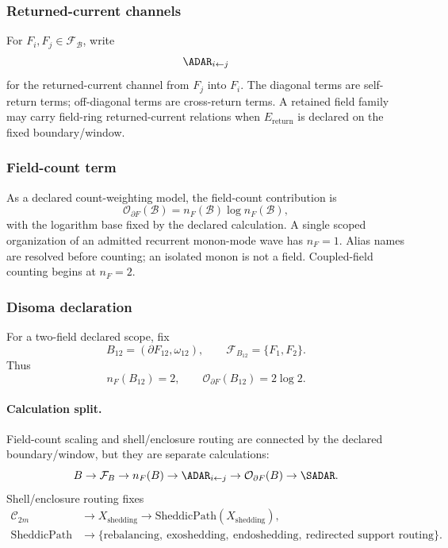 \subsubsection{Returned-current channels}
\label{subsec:returned-current-channels}
For \(F_i,F_j\in\mathcal F_{\mathcal B}\), write
\[
\ADAR_{i\leftarrow j}
\]
for the returned-current channel from \(F_j\) into \(F_i\). The diagonal terms are self-return terms; off-diagonal terms are cross-return terms. A retained field family may carry field-ring returned-current relations when \(E_{\mathrm{return}}\) is declared on the fixed boundary/window.

\subsubsection{Field-count term}
\label{subsec:field-count-term}
As a declared count-weighting model, the field-count contribution is
\begin{equation}
\mathcal O_{\partial F}(\mathcal B)=n_F(\mathcal B)\log n_F(\mathcal B),
\label{eq:field-count-term}
\end{equation}
with the logarithm base fixed by the declared calculation. A single scoped organization of an admitted recurrent monon-mode wave has \(n_F=1\). Alias names are resolved before counting; an isolated monon is not a field. Coupled-field counting begins at \(n_F=2\).

\subsubsection{Disoma declaration}
\label{subsec:disoma-declaration}
For a two-field declared scope, fix
\[
B_{12}=(\partial F_{12},\omega_{12}),
\qquad
\mathcal F_{B_{12}}=\{F_1,F_2\}.
\]
Thus
\[
n_F(B_{12})=2,
\qquad
\mathcal O_{\partial F}(B_{12})=2\log 2.
\]

\paragraph{Calculation split.}
Field-count scaling and shell/enclosure routing are connected by the declared boundary/window, but they are separate calculations:
\[
B\to \mathcal F_{B}\to n_F(B)\to \ADAR_{i\leftarrow j}\to \mathcal O_{\partial F}(B)\to \SADAR.
\]
Shell/enclosure routing fixes
\[
\begin{aligned}
\mathcal C_{2m}
&\to X_{\mathrm{shedding}}
\to \mathrm{SheddicPath}(X_{\mathrm{shedding}}),\\
\mathrm{SheddicPath}
&\to
\{\text{rebalancing},\ \text{exoshedding},\ \text{endoshedding},\ \text{redirected support routing}\}.
\end{aligned}
\]

